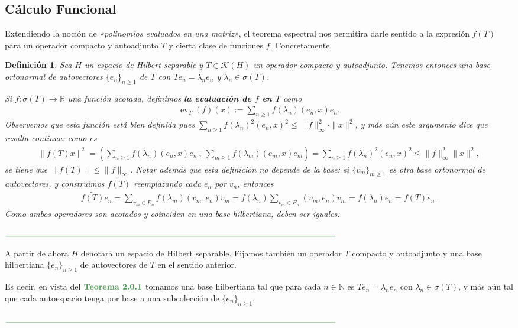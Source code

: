 \documentclass[11pt]{report}
\theoremstyle{colored}
\newtheorem{definition}{Definición}[section]
\newcommand{\N}{\mathbb{N}}
\newcommand{\R}{\mathbb{R}}
\newcommand{\ev}{\operatorname{ev}}
\newcommand{\ip}[1]{( #1 )}
\newcommand{\paint}[1]{\color{color}{#1}}
\newcommand{\tpaint}[1]{\paint{\textbf{#1}}}
\newcommand{\paintline}{\begin{center}
$\paint{
\rule{400pt}{0.5pt}
}$
\vspace{10pt}
\end{center}}
\begin{document}
\subsection{Cálculo Funcional}

Extendiendo la noción de \textit{«polinomios evaluados en una matriz»}, el teorema espectral nos permitira darle sentido a la expresión $f(T)$ para un operador compacto y autoadjunto $T$ y cierta clase de funciones $f$. Concretamente, 

\begin{definition} Sea $H$ un espacio de Hilbert separable y $T \in \mathscr{K}(H)$ un operador compacto y autoadjunto. Tenemos entonces una base ortonormal de autovectores $\{e_n\}_{n \geq 1}$ de $T$ con $Te_n = \lambda_ne_n$ y $\lambda_n \in \sigma(T)$. 

Si $f : \sigma(T) \to \R$ una función acotada, definimos \textbf{la evaluación de $f$ en $T$} como
\begin{align*}
\ev_T(f)(x) := \sum_{n \geq 1}f(\lambda_n)\ip{e_n,x}e_n.
\end{align*}
Observemos que esta función está bien definida pues $\sum_{n \geq 1}f(\lambda_n)^2\ip{e_n,x}^2 \leq \|f\|^2_\infty \cdot \|x\|^2$, y más aún este argumento dice que resulta continua: como es
\begin{align*}
\|f(T)x\|^2 = \left\ip{\sum_{n \geq 1}f(\lambda_n)\ip{e_n,x}e_n \ , \ \sum_{m \geq 1}f(\lambda_m)\ip{e_m,x}e_m\right} = \sum_{n \geq 1}f(\lambda_n)^2\ip{e_n,x}^2 \leq \|f\|^2_\infty\|x\|^2,
\end{align*}
se tiene que $\|f(T)\| \leq \|f\|_\infty$. Notar además que esta definición no depende de la base: si $\{v_m\}_{m \geq 1}$ es otra base ortonormal de autovectores, y construimos $\widetilde{f(T)}$ reemplazando cada $e_n$ por $v_n$, entonces
\begin{align*}
\widetilde{f(T)}e_n = \sum_{v_m \in E_n}f(\lambda_m)(v_m,e_n)v_m = f(\lambda_n)\sum_{v_m \in E_n}(v_m,e_n)v_m = f(\lambda_n)e_n = f(T)e_n.
\end{align*}
Como ambos operadores son acotados y coinciden en una base hilbertiana, deben ser iguales.
\end{definition}

\paintline
A partir de ahora $H$ denotará un espacio de Hilbert separable. Fijamos también un operador $T$ compacto y autoadjunto y una base hilbertiana $\{e_n\}_{n \geq 1}$ de autovectores de $T$ en el sentido anterior.

Es decir, en vista del $\tpaint{Teorema 2.0.1}$ tomamos una base hilbertiana tal que para cada $n \in \N$ es $Te_n = \lambda_ne_n$ con $\lambda_n \in \sigma(T)$, y más aún tal que cada autoespacio tenga por base a una subcolección de $\{e_n\}_{n \geq 1}$.
\paintline
\end{document}
